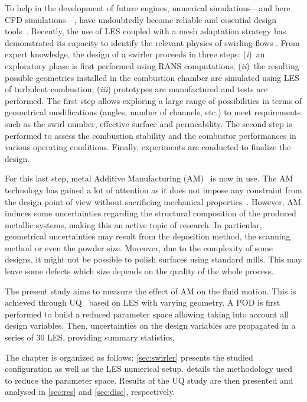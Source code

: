 To help in the development of future engines, numerical simulations---and here CFD simulations---, have undoubtedly become reliable and essential design tools~\cite{Sacks1989,forrester2009}. Recently, the use of LES coupled with a mesh adaptation strategy has demonstrated its capacity to identify the relevant physics of swirling flows \cite{Daviller2017}. 
From expert knowledge, the design of a swirler proceeds in three steps: (\emph{i})~an exploratory phase is first performed using RANS computations; (\emph{ii})~the resulting possible geometries installed in the combustion chamber are simulated using LES of turbulent combustion; (\emph{iii}) prototypes are manufactured and tests are performed. The first step allows exploring a large range of possibilities in terms of geometrical modifications (angles, number of channels, etc.) to meet requirements such as the swirl number, effective surface and permeability. The second step is performed to assess the combustion stability and the combustor performances in various operating conditions. Finally, experiments are conducted to finalize the design.

For this last step, metal Additive Manufacturing (AM)~\cite{Frazier2014,Sames2016} is now in use. The AM technology has gained a lot of attention as it does not impose any constraint from the design point of view without sacrificing mechanical properties~\cite{Lewandowski2016}. However, AM induces some uncertainties regarding the structural composition of the produced metallic systems, making this an active topic of research. In particular, geometrical uncertainties may result from the deposition method, the scanning method or even the powder size. Moreover, due to the complexity of some designs, it might not be possible to polish surfaces using standard mills. This may leave some defects which size depends on the quality of the whole process.

The present study aims to measure the effect of AM on the fluid motion. This is achieved through UQ~\cite{iooss2016} based on LES with varying geometry. A POD is first performed to build a reduced parameter space allowing taking into account all design variables. Then, uncertainties on the design variables are propagated in a series of 30 LES, providing summary statistics.

The chapter is organized as follows: \cref{sec:swirler} presents the studied configuration as well as the LES numerical setup.  details the methodology used to reduce the parameter space. Results of the UQ study are then presented and analysed in  \cref{sec:res} and \cref{sec:disc}, respectively.

